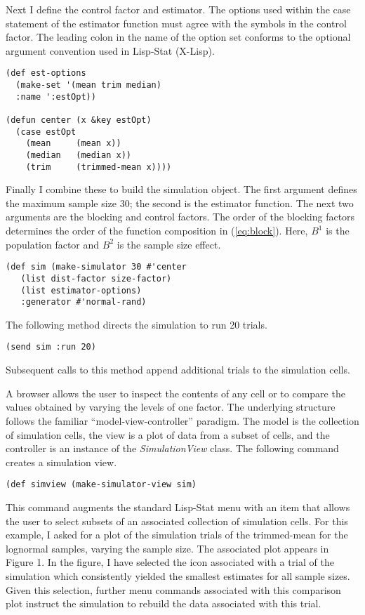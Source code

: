 Next I define the control factor and estimator. The options used
within the case statement of the estimator function must agree with
the symbols in the control factor. The leading colon in the name of
the option set conforms to the optional argument convention used in
Lisp-Stat (X-Lisp).
\begin{verbatim}
(def est-options
  (make-set '(mean trim median)
  :name ':estOpt))

(defun center (x &key estOpt)
  (case estOpt
    (mean     (mean x))
    (median   (median x))
    (trim     (trimmed-mean x))))
\end{verbatim}

Finally I combine these to build the simulation object.  The first
argument defines the maximum sample size 30; the second is the estimator
function.  The next two arguments are the blocking and control
factors.  The order of the blocking factors determines the order of
the function composition in (\ref{eq:block}).  Here, $B^1$ is the
population factor and $B^2$ is the sample size effect.
\begin{verbatim}
(def sim (make-simulator 30 #'center
   (list dist-factor size-factor)
   (list estimator-options)
   :generator #'normal-rand)
\end{verbatim}
\noindent The following method directs the simulation to run 20 trials.
\begin{verbatim}
(send sim :run 20)
\end{verbatim}
\noindent Subsequent calls to this method append
additional trials to the simulation cells. 

A browser allows the user to inspect the contents of any cell or to
compare the values obtained by varying the levels of one factor.  The
underlying structure follows the familiar ``model-view-controller''
paradigm.  The model is the collection of  simulation cells, the
view is a plot of data from a subset of cells, and the controller
is an instance of the {\it SimulationView} class.  The following
command creates a simulation view.
\begin{verbatim}
(def simview (make-simulator-view sim)
\end{verbatim}
This command augments the standard Lisp-Stat menu with an item that
allows the user to select subsets of an associated collection of
simulation cells.  For this example, I asked for a plot of the
simulation trials of the trimmed-mean for the lognormal samples,
varying the sample size.  The associated plot appears in Figure 1. In
the figure, I have selected the icon associated with a trial of the
simulation which consistently yielded the smallest estimates for all
sample sizes. Given this selection, further menu commands associated
with this comparison plot instruct the simulation to rebuild the data
associated with this trial.


